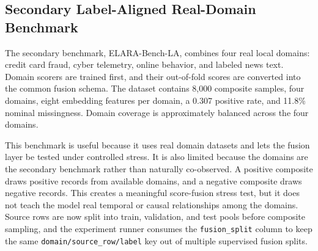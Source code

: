 \documentclass[11pt]{article}
\newcommand{\benchmark}{ELARA-Bench-LA}
\begin{document}
\begin{table}[H]
\centering
\caption{Naturally paired MVTec 3D-AD clean held-out performance across
eight categories. Values are mean$\pm$standard deviation with 95\% confidence
intervals across five seeds. Under the canonical one-class protocol, this table
is a supervised-fusion protocol diagnostic rather than a two-class leaderboard.}
\label{tab:thesis-mvtec-clean}
\scriptsize
\resizebox{\textwidth}{!}{}
\end{table}

\subsection{Secondary Label-Aligned Real-Domain Benchmark}

The secondary benchmark, \benchmark{}, combines four real local domains: credit
card fraud, cyber telemetry, online behavior, and labeled news text. Domain
scorers are trained first, and their out-of-fold scores are converted into the
common fusion schema. The dataset contains 8,000 composite samples, four
domains, eight embedding features per domain, a 0.307 positive rate, and 11.8\%
nominal missingness. Domain coverage is approximately balanced across the four
domains.

\begin{table}[H]
\centering
\caption{Benchmark metadata for the secondary synthetically paired fusion input.}
\label{tab:thesis-real-metadata}
\footnotesize

\end{table}

\begin{table}[H]
\centering
\caption{Out-of-fold domain scorer quality used to construct \benchmark{}.}
\label{tab:thesis-domain-scorers}
\footnotesize

\end{table}

This benchmark is useful because it uses real domain datasets and lets the
fusion layer be tested under controlled stress. It is also limited because the
domains are the secondary benchmark rather than naturally co-observed. A positive
composite draws positive records from available domains, and a negative
composite draws negative records. This creates a meaningful score-fusion stress
test, but it does not teach the model real temporal or causal relationships
among the domains. Source rows are now split into train, validation, and test
pools before composite sampling, and the experiment runner consumes the
\texttt{fusion\_split} column to keep the same \texttt{domain/source\_row/label}
key out of multiple supervised fusion splits.
\end{document}
